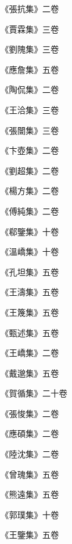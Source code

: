 \begin{pinyinscope}
 《張抗集》二卷



 《賈霖集》三卷



 《劉隗集》三卷



 《應詹集》五卷



 《陶侃集》二卷



 《王洽集》三卷



 《張闓集》三卷



 《卞壺集》二卷



 《劉超集》二卷



 《楊方集》二卷



 《傅純集》二卷



 《郗鑒集》十卷



 《溫嶠集》十卷



 《孔坦集》五卷



 《王濤集》五卷



 《王篾集》五卷



 《甄述集》五卷



 《王嶠集》二卷



 《戴邈集》五卷



 《賀循集》二十卷



 《張悛集》二卷



 《應碩集》二卷



 《陸沈集》二卷



 《曾瑰集》五卷



 《熊遠集》五卷



 《郭璞集》十卷



 《王鑒集》五卷




\end{pinyinscope}
